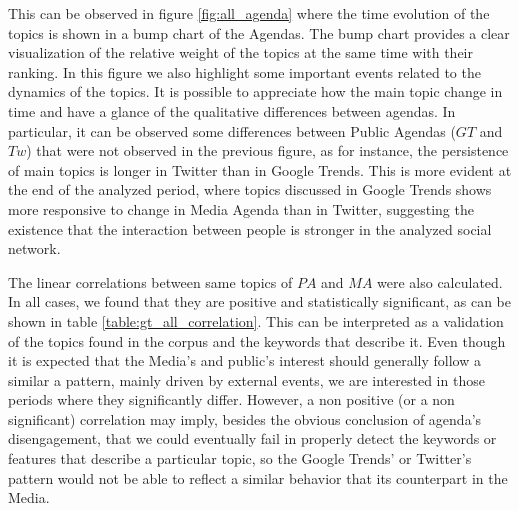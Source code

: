 \documentclass{bmcart}
\begin{document}
\par This can be observed in figure \ref{fig:all_agenda} where the time evolution of the topics is shown in a bump chart of the Agendas. The bump chart provides  a clear visualization of the relative weight of the topics at the same time with their ranking. In  this figure  we also highlight some important events related to the dynamics of the topics.
It is possible to appreciate how the main topic change in time and have a glance of the qualitative differences between agendas. In particular, it can be observed some differences between Public Agendas ($GT$ and $Tw$) that were not observed in the previous figure, as for instance, the persistence of main topics is longer in Twitter than in Google Trends. This is more evident at the end of the analyzed period, where topics discussed in Google Trends shows more  responsive to change in Media Agenda than in Twitter, suggesting the existence that the interaction between people is stronger in the analyzed social network.


\par The linear correlations between same topics of $PA$ and $MA$ were also calculated. In all cases, we found that they are positive and statistically significant, as can be shown in table \ref{table:gt_all_correlation}.  This can be interpreted as a validation of the topics found in the corpus and the keywords that describe it. Even though it is expected that the Media's and public's interest should generally follow a similar a pattern, mainly driven by  external events, we are interested in those periods where they significantly differ. 
However, a non positive (or a non significant) correlation may imply, besides the obvious conclusion of agenda's disengagement, that we could eventually fail in properly detect the keywords or features that describe a particular topic, so the Google Trends' or Twitter's pattern would not be able to reflect a similar behavior that its counterpart in the Media.

\end{document}

